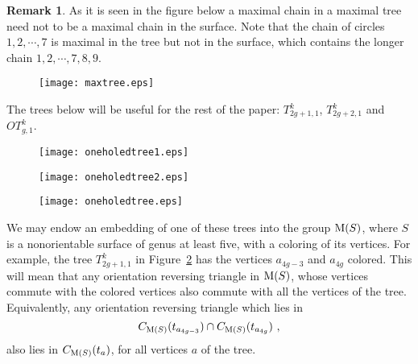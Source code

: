\documentclass[11 pt]{amsart}
\theoremstyle{definition}
\newtheorem{Remark}[Theorem]{Remark}
\begin{document}
\begin{Remark}\label{Remark-MaxChainInTree vs In Surface}
As it is seen in the figure below a maximal chain in a maximal tree
need not to be a maximal chain in the surface. Note that the chain
of circles $1,2,\cdots,7$ is maximal in the tree but not in the
surface, which contains the longer chain $1,2,\cdots,7,8,9$.

\begin{figure}[hbt]
 \begin{center}
 \texttt{[image: maxtree.eps]}
\caption {} \label{maxtree}
\end{center}
\end{figure}
\end{Remark}

The trees below will be useful for the rest of the paper:
$T_{2g+1,1}^k$,  $T_{2g+2,1}^k$ and $OT_{g,1}^k$.

\begin{figure}[hbt]
 \begin{center}
 \texttt{[image: oneholedtree1.eps]}
\caption {} \label{oneholedtree1}
\end{center}
\end{figure}

\begin{figure}[hbt]
 \begin{center}
 \texttt{[image: oneholedtree2.eps]}
\caption {} \label{oneholedtree2}
\end{center}
\end{figure}

\begin{figure}[hbt]
 \begin{center}
 \texttt{[image: oneholedtree.eps]}
\caption {} \label{oneholedtree}
\end{center}
\end{figure}

We may endow an embedding of one of these trees into the group ${\rm
M}(S)$, where $S$ is a nonorientable surface of genus at least five,
with a coloring of its vertices.  For example, the tree
$T_{2g+1,1}^k$ in Figure~\ref{oneholedtree1}  has the vertices
$a_{4g-3}$ and $a_{4g}$ colored. This will mean that any orientation
reversing triangle in ${\rm M}(S)$, whose vertices commute with the
colored vertices also commute with all the vertices of the tree.
Equivalently, any orientation reversing triangle which lies in
$$C_{{\rm M}(S)}(t_{a_{4g-3}})\cap C_{{\rm M}(S)}(t_{a_{4g}}) \ ,$$
also lies in $C_{{\rm M}(S)}(t_{a})$, for all vertices $a$ of the
tree.
\end{document}
